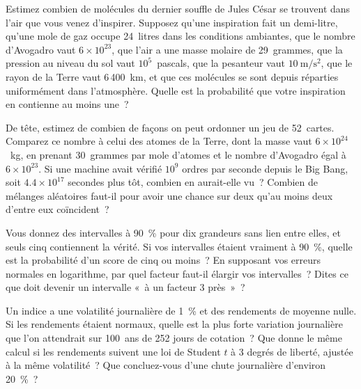 \begin{question}\label{iq:iv1:estimation:19}
Estimez combien de molécules du dernier souffle de Jules César se trouvent dans l'air que vous venez d'inspirer. Supposez qu'une inspiration fait un demi-litre, qu'une mole de gaz occupe 24~litres dans les conditions ambiantes, que le nombre d'Avogadro vaut $6 \times 10^{23}$, que l'air a une masse molaire de 29~grammes, que la pression au niveau du sol vaut $10^5$~pascals, que la pesanteur vaut $10\ \mathrm{m/s^2}$, que le rayon de la Terre vaut 6\,400~km, et que ces molécules se sont depuis réparties uniformément dans l'atmosphère. Quelle est la probabilité que votre inspiration en contienne au moins une~?
\end{question}

\begin{question}\label{iq:iv1:estimation:20}
De tête, estimez de combien de façons on peut ordonner un jeu de 52~cartes. Comparez ce nombre à celui des atomes de la Terre, dont la masse vaut $6 \times 10^{24}$~kg, en prenant 30~grammes par mole d'atomes et le nombre d'Avogadro égal à $6 \times 10^{23}$. Si une machine avait vérifié $10^9$ ordres par seconde depuis le Big Bang, soit $4.4 \times 10^{17}$ secondes plus tôt, combien en aurait-elle vu~? Combien de mélanges aléatoires faut-il pour avoir une chance sur deux qu'au moins deux d'entre eux coïncident~?
\end{question}

\begin{question}\label{iq:iv1:estimation:21}
Vous donnez des intervalles à 90~\% pour dix grandeurs sans lien entre elles, et seuls cinq contiennent la vérité. Si vos intervalles étaient vraiment à 90~\%, quelle est la probabilité d'un score de cinq ou moins~? En supposant vos erreurs normales en logarithme, par quel facteur faut-il élargir vos intervalles~? Dites ce que doit devenir un intervalle «~à un facteur 3 près~»~?
\end{question}

\begin{question}\label{iq:iv1:estimation:22}
Un indice a une volatilité journalière de 1~\% et des rendements de moyenne nulle. Si les rendements étaient normaux, quelle est la plus forte variation journalière que l'on attendrait sur 100~ans de 252 jours de cotation~? Que donne le même calcul si les rendements suivent une loi de Student $t$ à 3 degrés de liberté, ajustée à la même volatilité~? Que concluez-vous d'une chute journalière d'environ 20~\%~?
\end{question}

